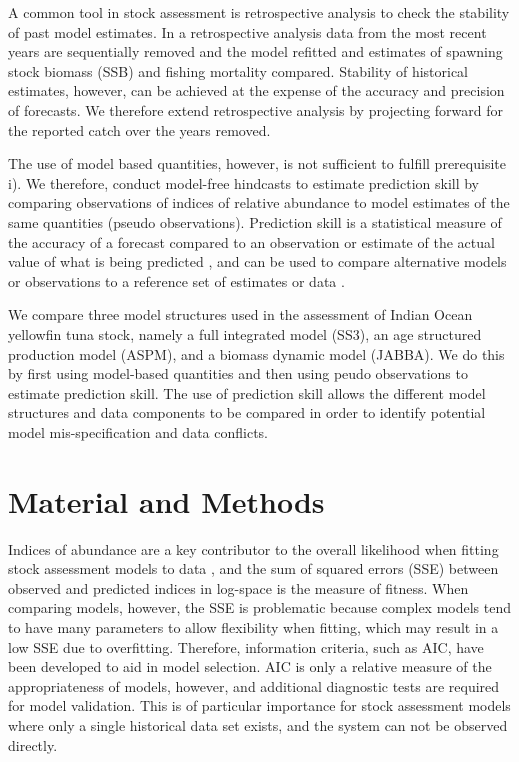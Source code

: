 \documentclass[12pt,halfline,a4paper,nonumbib]{ouparticle}
\begin{document}
A common tool in stock assessment is retrospective analysis to check the stability of past model estimates\parencite{hurtado2014looking}. In a retrospective analysis data from the most recent years are sequentially removed and the model refitted and estimates of spawning stock biomass (SSB) and fishing mortality compared. Stability of historical estimates, however, can be achieved at the expense of the accuracy and precision of forecasts. We therefore extend retrospective analysis by projecting forward for the reported catch over the years removed. 

The use of model based quantities, however, is not sufficient to fulfill prerequisite i). We therefore, conduct model-free hindcasts to estimate prediction skill by comparing observations of indices of relative abundance to model estimates of the same quantities (pseudo observations). Prediction skill is a statistical measure of the accuracy of a forecast compared to an observation or estimate of the actual value of what is being predicted \parencite{huschke1959glossary}, and can be used to compare alternative models or observations to a reference set of estimates or data \parencite{jin2008current, weigel2008can, balmaseda1995decadal}.
 
We compare three model structures used in the assessment of Indian Ocean yellowfin tuna stock, namely a full integrated model (SS3), an age structured production model (ASPM), and a biomass dynamic model (JABBA). We do this by first using model-based quantities and then using peudo observations to estimate prediction skill. The use of prediction skill allows the different model structures and data components to be compared in order to identify potential model mis-specification and data conflicts. 


\section{Material and Methods}
Indices of abundance are a key contributor to the overall likelihood when fitting stock assessment models to data \parencite{whitten2013accounting}, and the sum of squared errors (SSE) between observed and predicted indices in log-space is the measure of fitness. When comparing models, however, the SSE is problematic because complex models tend to have many parameters to allow flexibility when fitting, which may result in a low SSE due to overfitting. Therefore, information criteria, such as AIC, have been developed to aid in model selection. AIC is only a relative measure of the appropriateness of models, however, and additional diagnostic tests are required for model validation. This is of particular importance for stock assessment models where only a single historical data set exists, and the system can not be observed directly. 
\end{document}
